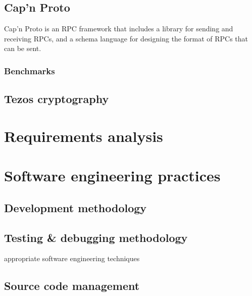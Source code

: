 \subsection{Cap'n Proto}
Cap'n Proto is an RPC framework that includes a library for sending and receiving RPCs, and a schema language for designing the format of RPCs that can be sent. 
\subsubsection{Benchmarks}

\subsection{Tezos cryptography}
\section{Requirements analysis}
\section{Software engineering practices}
\subsection{Development methodology}
\subsection{Testing \& debugging methodology}
appropriate software engineering techniques
\subsection{Source code management}